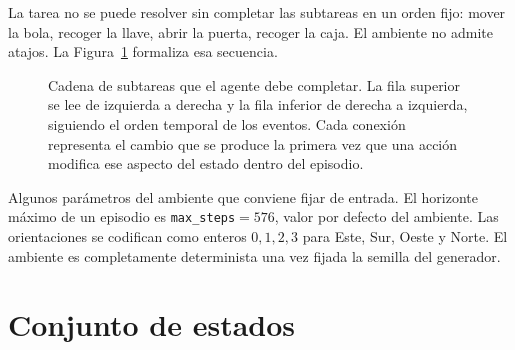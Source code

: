 \documentclass[11pt,a4paper]{article}
\begin{document}
La tarea no se puede resolver sin completar las subtareas en un orden fijo:
mover la bola, recoger la llave, abrir la puerta, recoger la caja. El
ambiente no admite atajos. La Figura~\ref{fig:subtasks} formaliza esa
secuencia.

\begin{figure}[h]
  \centering
  \caption{Cadena de subtareas que el agente debe completar. La fila
  superior se lee de izquierda a derecha y la fila inferior de derecha a
  izquierda, siguiendo el orden temporal de los eventos. Cada conexión
  representa el cambio que se produce la primera vez que una acción
  modifica ese aspecto del estado dentro del episodio.}
  \label{fig:subtasks}
\end{figure}

Algunos parámetros del ambiente que conviene fijar de entrada. El horizonte
máximo de un episodio es \texttt{max\_steps}\(=576\), valor por defecto del
ambiente. Las orientaciones se codifican como enteros \(0,1,2,3\) para Este,
Sur, Oeste y Norte. El ambiente es completamente determinista una vez fijada
la semilla del generador.

\section{Conjunto de estados}
\label{sec:estados}
\end{document}
